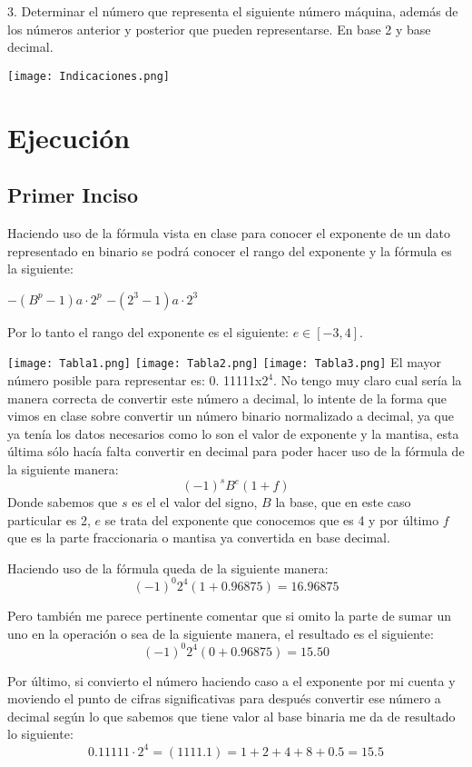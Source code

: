 \documentclass{article}
\begin{document}
3. Determinar el número que representa el siguiente número máquina, además de los números
anterior y posterior que pueden representarse. En base 2 y base decimal.

\texttt{[image: Indicaciones.png]}

\section{Ejecución}
\subsection{Primer Inciso}
Haciendo uso de la fórmula vista en clase para conocer el exponente de un dato
representado en binario se podrá conocer el rango del exponente y la fórmula es la
siguiente:

$-(B^p - 1 ) a\cdot2^p $
$-(2^3 - 1 ) a\cdot2^3 $

Por lo tanto el rango del exponente es el siguiente: $e \in [-3, 4]$. 

\texttt{[image: Tabla1.png]}
\texttt{[image: Tabla2.png]}
\texttt{[image: Tabla3.png]}
El mayor número posible para representar es: 0. 11111x$2^4$.
No tengo muy claro cual sería la manera correcta de convertir este número a
decimal, lo intente de la forma que vimos en clase sobre convertir un número binario 
normalizado a decimal, ya que ya tenía los datos necesarios como lo son el valor de
exponente y la mantisa, esta última sólo hacía falta convertir en decimal para poder
hacer uso de la fórmula de la siguiente manera:
$$(-1)^s B^e (1+f)$$
Donde sabemos que $s$ es el el valor del signo, $B$ la base, que en este caso
particular es 2, $e$ se trata del exponente que conocemos que es 4 y por último $f$
que es la parte fraccionaria o mantisa ya convertida en base decimal.

Haciendo uso de la fórmula queda de la siguiente manera:
$$(-1)^0 2^4(1 + 0. 96875) = 16. 96875$$

Pero también me parece pertinente comentar que si omito la parte de sumar un uno
en la operación o sea de la siguiente manera, el resultado es el siguiente:
$$(- 1)^0 2^4(0 + 0. 96875) = 15. 50$$

Por último, si convierto el número haciendo caso a el exponente por mi cuenta y
moviendo el punto de cifras significativas para después convertir ese número a
decimal según lo que sabemos que tiene valor al base binaria me da de resultado lo
siguiente:
$$0.11111\cdot2^4 = (1111. 1) = 1 + 2 + 4 + 8 + 0. 5 = 15. 5$$
\end{document}
